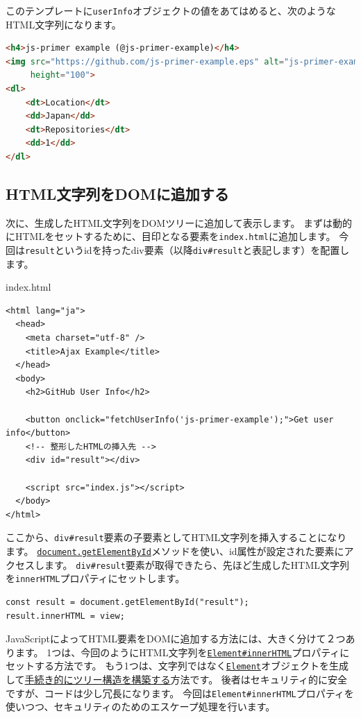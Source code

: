 このテンプレートに\texttt{userInfo}オブジェクトの値をあてはめると、次のようなHTML文字列になります。

\begin{lstlisting}[language=HTML]
<h4>js-primer example (@js-primer-example)</h4>
<img src="https://github.com/js-primer-example.eps" alt="js-primer-example" 
     height="100">
<dl>
    <dt>Location</dt>
    <dd>Japan</dd>
    <dt>Repositories</dt>
    <dd>1</dd>
</dl>
\end{lstlisting}

\hypertarget{html-to-dom}{%
\subsection{HTML文字列をDOMに追加する}\label{html-to-dom}}

次に、生成したHTML文字列をDOMツリーに追加して表示します。
まずは動的にHTMLをセットするために、目印となる要素を\texttt{index.html}に追加します。
今回は\texttt{result}というidを持ったdiv要素（以降\texttt{div\#result}と表記します）を配置します。

\begin{listtitle}
index.html
\end{listtitle}
\begin{lstlisting}
<html lang="ja">
  <head>
    <meta charset="utf-8" />
    <title>Ajax Example</title>
  </head>
  <body>
    <h2>GitHub User Info</h2>

    <button onclick="fetchUserInfo('js-primer-example');">Get user info</button>
    <!-- 整形したHTMLの挿入先 -->
    <div id="result"></div>

    <script src="index.js"></script>
  </body>
</html>
\end{lstlisting}
\listend

ここから、\texttt{div\#result}要素の子要素としてHTML文字列を挿入することになります。
\href{https://developer.mozilla.org/ja/docs/Web/API/Document/getElementById}\texttt{document.getElementById}メソッドを使い、id属性が設定された要素にアクセスします。
\texttt{div\#result}要素が取得できたら、先ほど生成したHTML文字列を\texttt{innerHTML}プロパティにセットします。

\begin{lstlisting}
const result = document.getElementById("result");
result.innerHTML = view;
\end{lstlisting}

JavaScriptによってHTML要素をDOMに追加する方法には、大きく分けて２つあります。
1つは、今回のようにHTML文字列を\href{https://developer.mozilla.org/ja/docs/Web/API/Element/innerHTML}\texttt{Element\#innerHTML}プロパティにセットする方法です。
もう1つは、文字列ではなく\href{https://developer.mozilla.org/ja/docs/Web/API/Element}\texttt{Element}オブジェクトを生成して\href{https://developer.mozilla.org/ja/docs/Web/API/Node/appendChild}{手続き的にツリー構造を構築する}方法です。
後者はセキュリティ的に安全ですが、コードは少し冗長になります。
今回は\texttt{Element\#innerHTML}プロパティを使いつつ、セキュリティのためのエスケープ処理を行います。

